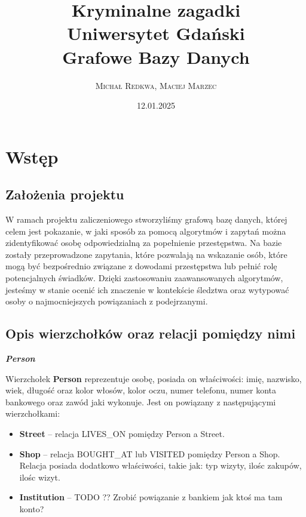 \documentclass[a4paper,12pt]{article}
\title{\vspace{2cm} \textbf{\Huge Kryminalne zagadki} \\[1cm] \large Uniwersytet Gdański \\ Grafowe Bazy Danych \vspace{2cm}}
\author{\textsc{Michał Redkwa, Maciej Marzec}}
\date{12.01.2025}
\begin{document}
\maketitle

\newpage

\section{Wstęp}
\subsection{Założenia projektu}

W ramach projektu zaliczeniowego stworzyliśmy grafową bazę danych, której celem jest pokazanie, w jaki sposób za pomocą algorytmów i zapytań można zidentyfikować osobę odpowiedzialną za popełnienie przestępstwa. Na bazie zostały przeprowadzone zapytania, które pozwalają na wskazanie osób, które mogą być bezpośrednio związane z dowodami przestępstwa lub pełnić rolę potencjalnych świadków. Dzięki zastosowaniu zaawansowanych algorytmów, jesteśmy w stanie ocenić ich znaczenie w kontekście śledztwa oraz wytypować osoby o najmocniejszych powiązaniach z podejrzanymi.

\subsection{Opis wierzchołków oraz relacji pomiędzy nimi}

\begin{center}
    \textbf{\textit{Person}}
\end{center}

Wierzchołek \textbf{Person} reprezentuje osobę, posiada on właściwości: imię, nazwisko, wiek, długość oraz kolor włosów, kolor oczu, numer telefonu, numer konta bankowego oraz zawód jaki wykonuje. Jest on powiązany z następującymi wierzchołkami:

\begin{itemize}
    \item \textbf{Street} – relacja LIVES\_ON pomiędzy Person a Street.
    \item \textbf{Shop} – relacja BOUGHT\_AT lub VISITED pomiędzy Person a Shop. Relacja posiada dodatkowo właściwości, takie jak: typ wizyty, ilośc zakupów, ilośc wizyt.
    \item \textbf{Institution} – TODO ?? Zrobić powiązanie z bankiem jak ktoś ma tam konto?
\end{itemize}
\end{document}
